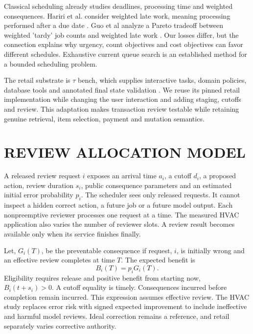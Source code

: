 Classical scheduling already studies deadlines, processing time and weighted consequences. Hariri et al. consider weighted late work, meaning processing performed after a due date \cite{hariri1995latework}. Guo et al analyze a Pareto tradeoff between weighted 'tardy' job counts and weighted late work \cite{guo2022pareto}. Our losses differ, but the connection explains why urgency, count objectives and cost objectives can favor different schedules. Exhaustive current queue search is an established method for a bounded scheduling problem.

The retail substrate is $\tau$ bench, which supplies interactive tasks, domain policies, database tools and annotated final state validation \cite{yao2024tau}. We reuse its pinned retail implementation while changing the user interaction and adding staging, cutoffs and review. This adaptation makes transaction review testable while retaining genuine retrieval, item selection, payment and mutation semantics.




\section{REVIEW ALLOCATION MODEL}
\noindent A released review request $i$ exposes an arrival time $a_i$, a cutoff $d_i$, a proposed action, review duration $s_i$, public consequence parameters and an estimated initial error probability $p_i$. The scheduler sees only released requests. It cannot inspect a hidden correct action, a future job or a future model output. Each nonpreemptive reviewer processes one request at a time. The measured HVAC application also varies the number of reviewer slots. A review result becomes available only when its service finishes finally.

Let, $G_i(T)$, be the preventable consequence if request, $i$, is initially wrong and an effective review completes at time $T$. The expected benefit is
\begin{equation}
 B_i(T)=p_iG_i(T).
 \label{eq:benefit}
\end{equation}
Eligibility requires release and positive benefit from starting now, $B_i(t+s_i)>0$. A cutoff equality is timely. Consequences incurred before completion remain incurred. This expression assumes effective review. The HVAC study replaces error risk with signed expected improvement to include ineffective and harmful model reviews. Ideal correction remains a reference, and retail separately varies corrective authority.


